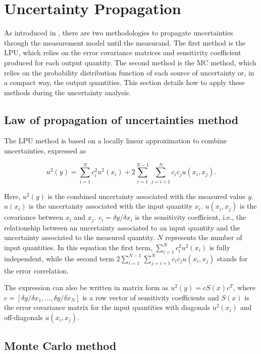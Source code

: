 \section{Uncertainty Propagation} \label{sec:uncertainty_propagation}

As introduced in \cite{QA4EO2}, there are two methodologies to propagate
uncertainties through the measurement model until the measurand. The first
method is the \ac{LPU}, which relies on the error covariance matrices and
sensitivity coefficient produced for each output quantity. The second method is
the \ac{MC} method, which relies on the probability distribution function of
each source of uncertainty or, in a compact way, the output quantities. This
section details how to apply these methods during the uncertainty analysis.

\subsection{Law of propagation of uncertainties method}

The \ac{LPU} method is based on a locally linear
approximation to combine uncertainties, expressed as

\begin{equation}
  u^2(y) = \sum_{i=1}^N c_i^2 u^2(x_i) + 2 \sum_{i=1}^{N-1} \sum_{j=i+1}^N c_i c_j u(x_i, x_j).
  \label{eq:propagation}
\end{equation}

\noindent Here, $u^2(y)$ is the combined uncertainty associated with the
measured value $y$. $u(x_i)$ is the uncertainty associated with the input
quantity $x_i$. $u(x_i, x_j)$ is the covariance between $x_i$ and $x_j$.
$c_i=\delta y/ \delta x_i $ is the sensitivity coefficient, i.e., the
relationship between an uncertainty associated to an input quantity and the
uncertainty associated to the measured quantity. $N$ represents the number of
input quantities. In this equation the first term, $\sum_{i=1}^N c_i^2
u^2(x_i)$ is fully independent, while the second term $2 \sum_{i=1}^{N-1}
\sum_{j=i+1}^N c_i c_j u(x_i, x_j)$ stands for the error correlation.

The expression can also be written in matrix form as $u^2(y)=cS(x)c^T$, where
$c=[\delta y/\delta x_1, ..., \delta y/\delta x_N]$ is a row vector of
sensitivity coefficients and $S(x)$ is the error covariance matrix for the
input quantities with diagonals $u^2(x_i)$ and off-diagonals $u(x_i, x_j)$.

\subsection{Monte Carlo method}

